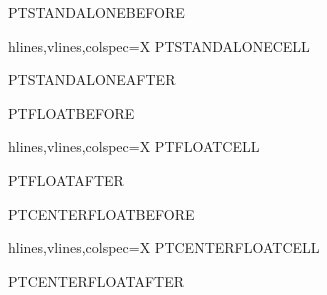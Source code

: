 \documentclass[oneside,nominted]{pt-report}
\begin{document}
\noindent PTSTANDALONEBEFORE\par
\begin{tblr}{hlines,vlines,colspec={X}}
    PTSTANDALONECELL
\end{tblr}
\noindent PTSTANDALONEAFTER\par

\newpage

\noindent PTFLOATBEFORE\par
\begin{table}[H]
    \centering
    \begin{tblr}{hlines,vlines,colspec={X}}
        PTFLOATCELL
    \end{tblr}
    \caption{PTFLOATCAPTION}
\end{table}
\noindent PTFLOATAFTER\par

\newpage

\noindent PTCENTERFLOATBEFORE\par
\begin{table}[H]
    \begin{center}
        \begin{tblr}{hlines,vlines,colspec={X}}
            PTCENTERFLOATCELL
        \end{tblr}
    \end{center}
    \caption{PTCENTERFLOATCAPTION}
\end{table}
\noindent PTCENTERFLOATAFTER\par
\end{document}
